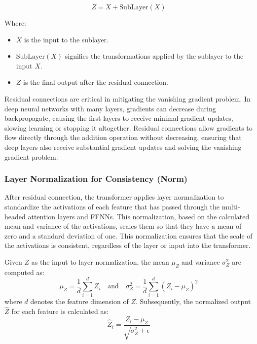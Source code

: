 \begin{equation}
    Z = X + \text{SubLayer}(X)
\end{equation}

Where:
\begin{itemize}
    \item \(X\) is the input to the sublayer.
    \item \(\text{SubLayer}(X)\) signifies the transformations applied by the sublayer to the input \(X\).
    \item \(Z\) is the final output after the residual connection.
\end{itemize}

Residual connections are critical in mitigating the vanishing gradient problem. In deep neural networks with many layers, gradients can decrease during backpropagate, causing the first layers to receive minimal gradient updates, slowing learning or stopping it altogether. Residual connections allow gradients to flow directly through the addition operation without decreasing, ensuring that deep layers also receive substantial gradient updates and solving the vanishing gradient problem.

\subsubsection{Layer Normalization for Consistency (Norm)}

After residual connection, the transformer applies layer normalization to standardize the activations of each feature that has passed through the multi-headed attention layers and FFNNs. This normalization, based on the calculated mean and variance of the activations, scales them so that they have a mean of zero and a standard deviation of one. This normalization ensures that the scale of the activations is consistent, regardless of the layer or input into the transformer.

Given \( Z \) as the input to layer normalization, the mean \( \mu_Z \) and variance \( \sigma_Z^2 \) are computed as:
\begin{equation}
\mu_Z = \frac{1}{d} \sum_{i=1}^{d} Z_i \quad \text{and} \quad \sigma_Z^2 = \frac{1}{d} \sum_{i=1}^{d} (Z_i - \mu_Z)^2
\end{equation}
where \( d \) denotes the feature dimension of \( Z \). Subsequently, the normalized output \( \hat{Z} \) for each feature is calculated as:
\begin{equation}
\hat{Z}_i = \frac{Z_i - \mu_Z}{\sqrt{\sigma_Z^2 + \epsilon}}
\end{equation}

